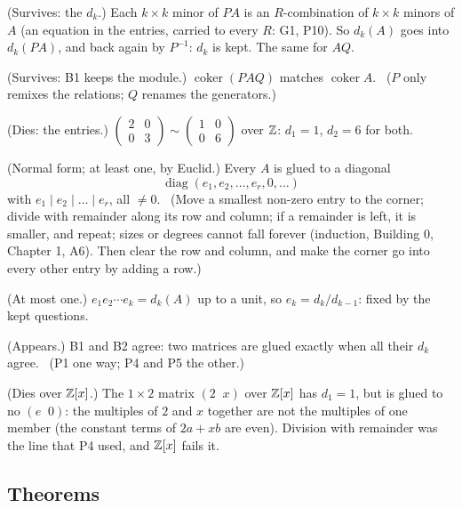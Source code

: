 \begin{lines}
\item[\lab{P1}] (Survives: the $d_k$.) Each $k \times k$ minor of $PA$ is an $R$-combination of $k \times k$ minors of $A$ (an equation in the entries, carried to every $R$: G1, P10). So $d_k(A)$ goes into $d_k(PA)$, and back again by $P^{-1}$: $d_k$ is kept. The same for $AQ$.
\item[\lab{P2}] (Survives: B1 keeps the module.) $\operatorname{coker}(PAQ)$ matches $\operatorname{coker} A$. \ ($P$ only remixes the relations; $Q$ renames the generators.)
\item[\lab{P3}] (Dies: the entries.) $\begin{pmatrix} 2 & 0 \\ 0 & 3 \end{pmatrix} \sim \begin{pmatrix} 1 & 0 \\ 0 & 6 \end{pmatrix}$ over $\mathbb{Z}$: $d_1 = 1$, $d_2 = 6$ for both.
\item[\lab{P4}] (Normal form; at least one, by Euclid.) Every $A$ is glued to a diagonal \[ \operatorname{diag}(e_1, e_2, \dots, e_r, 0, \dots) \] with $e_1 \mid e_2 \mid \dots \mid e_r$, all $\ne 0$. \ (Move a smallest non-zero entry to the corner; divide with remainder along its row and column; if a remainder is left, it is smaller, and repeat; sizes or degrees cannot fall forever (induction, Building 0, Chapter 1, A6). Then clear the row and column, and make the corner go into every other entry by adding a row.)
\item[\lab{P5}] (At most one.) $e_1 e_2 \cdots e_k = d_k(A)$ up to a unit, so $e_k = d_k / d_{k-1}$: fixed by the kept questions.
\item[\lab{P6}] (Appears.) B1 and B2 agree: two matrices are glued exactly when all their $d_k$ agree. \ (P1 one way; P4 and P5 the other.)
\item[\lab{P7}] (Dies over $\mathbb{Z}[x]$.) The $1 \times 2$ matrix $(2 \;\; x)$ over $\mathbb{Z}[x]$ has $d_1 = 1$, but is glued to no $(e \;\; 0)$: the multiples of $2$ and $x$ together are not the multiples of one member (the constant terms of $2a + xb$ are even). Division with remainder was the line that P4 used, and $\mathbb{Z}[x]$ fails it.
\end{lines}

\subsection*{Theorems}

